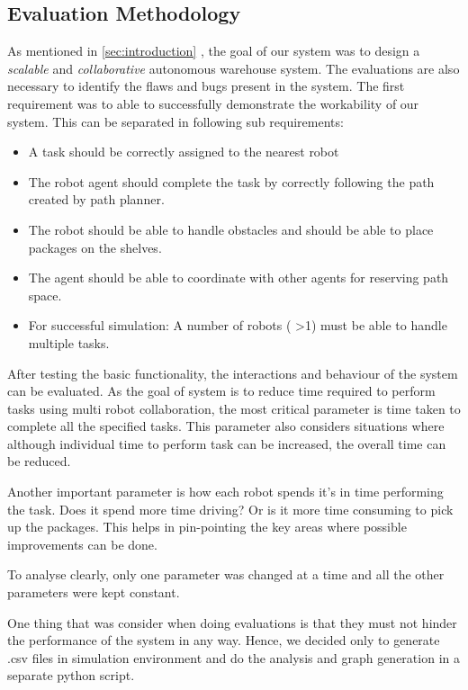 \documentclass[journal]{IEEEtran}
\newcommand{\compref}[1]{\autoref{#1} \nameref{#1}}
\begin{document}
\subsection{Evaluation Methodology}
\label{evaluation_methodology}
As mentioned in \compref{sec:introduction}, the goal of our system was to design a \textit{scalable} and \textit{collaborative} autonomous warehouse system. The evaluations are also necessary to identify the flaws and bugs present in the system.
The first requirement was to able to successfully demonstrate the workability of our system. This can be separated in following sub requirements:
\begin{itemize}
\item A task should be correctly assigned to the nearest robot
\item The robot agent should complete the task by correctly following the path created by path planner.
\item The robot should be able to handle obstacles and should be able to place packages on the shelves.
\item The agent should be able to coordinate with other agents for reserving path space. 
\item For successful simulation: A number of robots ( \textgreater 1) must be able to handle multiple tasks.
\end{itemize}
After testing the basic functionality, the interactions and behaviour of the system can be evaluated. As the goal of system is to reduce time required to perform tasks using multi robot collaboration, the most critical parameter is time taken to complete all the specified tasks. This parameter also considers situations where although individual time to perform task can be increased, the overall time can be reduced.

Another important parameter is how each robot spends it's in time performing the task. Does it spend more time driving? Or is it more time consuming to pick up the packages. This helps in pin-pointing the key areas where possible improvements can be done. 

To analyse clearly, only one parameter was changed at a time and all the other parameters were kept constant.

One thing that was consider when doing evaluations is that they must not hinder the performance of the system in any way. Hence, we decided only to generate .csv files in simulation environment and do the analysis and graph generation in a separate python script.
\end{document}
